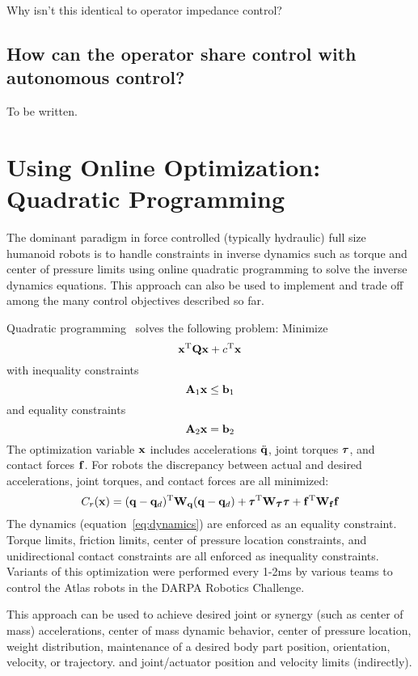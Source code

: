 \documentclass[letterpaper,12pt,fullpage]{article}
\begin{document}
Why isn't this identical to operator impedance control?

\subsection{How can the operator share control with autonomous control?}

To be written.

\section{Using Online Optimization: Quadratic Programming}

The dominant paradigm in force controlled (typically
hydraulic) full size humanoid robots is to handle constraints in inverse dynamics
such as torque and center of pressure limits using online quadratic programming
to solve the inverse dynamics equations. This approach can also be used
to implement and trade off among the many control objectives described so far.

Quadratic programming~\cite{Wikipedia} solves the following problem:
Minimize
\begin{equation}
{\bf x}^{{\rm T}} {\bf Q} {\bf x} + c^{{\rm T}} {\bf x}
\end{equation}
with inequality constraints
\begin{equation}
{\bf A}_1 {\bf x} \le {\bf b}_1
\end{equation}
and equality constraints
\begin{equation}
{\bf A}_2 {\bf x} = {\bf b}_2
\end{equation}
The optimization variable ${\bf x}$ includes accelerations $\ddot{{\bf q}}$, joint
torques $\vtau$, and contact forces ${\bf f}$.
For robots the discrepancy between actual and desired accelerations, joint
torques, and contact forces are all minimized:
\begin{equation}
C_r(\vx) = (\vq - \vq_d)^{\tr} \mW_{\vq} (\vq - \vq_d) + \vtau^{\tr} \mW_{\vtau} \vtau
+ \vf^{\tr} \mW_{\vf} \vf
\end{equation}
The dynamics (equation~\ref{eq:dynamics}) are enforced as an equality constraint.
Torque limits, friction limits, center of pressure location constraints,
and unidirectional contact constraints are all
enforced as inequality constraints.
Variants of this optimization
were performed every 1-2ms by various teams to control the
Atlas robots in the DARPA Robotics Challenge.

This approach can be used to achieve desired joint or synergy (such as center
of mass) accelerations, center of mass dynamic behavior, center of pressure location,
weight distribution, maintenance of a desired body part position, orientation,
velocity, or trajectory. and joint/actuator position and velocity limits (indirectly).
\end{document}
